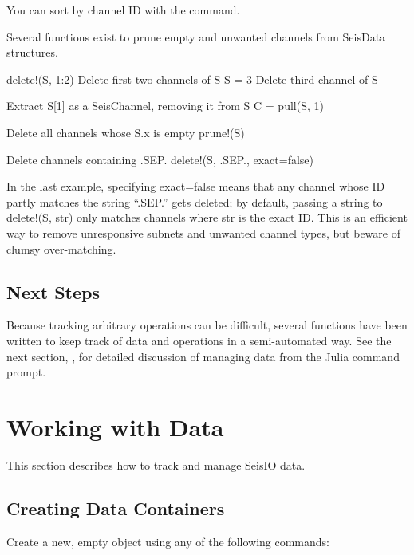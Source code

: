 \documentclass[letterpaper,11pt,english]{sphinxmanual}
\begin{document}
You can sort by channel ID with the  command.

Several functions exist to prune empty and unwanted channels from SeisData
structures.

%
\begin{sphinxVerbatim}[commandchars=\\\{\}]
delete!(S, 1:2)  \PYGZsh{} Delete first two channels of S
S \PYGZhy{}= 3           \PYGZsh{} Delete third channel of S

\PYGZsh{} Extract S[1] as a SeisChannel, removing it from S
C = pull(S, 1)

\PYGZsh{} Delete all channels whose S.x is empty
prune!(S)

\PYGZsh{} Delete channels containing \PYGZdq{}.SEP.\PYGZdq{}
delete!(S, \PYGZdq{}.SEP.\PYGZdq{}, exact=false)
\end{sphinxVerbatim}

In the last example, specifying exact=false means that any channel whose ID
partly matches the string “.SEP.” gets deleted; by default, passing
a string to delete!(S, str) only matches channels where str is the exact ID.
This is an efficient way to remove unresponsive subnets and unwanted channel
types, but beware of clumsy over-matching.


\subsection{Next Steps}
\label{\detokenize{src/tutorial:next-steps}}
Because tracking arbitrary operations can be difficult, several functions have
been written to keep track of data and operations in a semi-automated way. See
the next section, {\hyperref[\detokenize{src/working_with_data:wwd}]{}}, for detailed discussion of
managing data from the Julia command prompt.


\section{Working with Data}
\label{\detokenize{src/working_with_data:working-with-data}}\label{\detokenize{src/working_with_data:wwd}}\label{\detokenize{src/working_with_data::doc}}
This section describes how to track and manage SeisIO data.


\subsection{Creating Data Containers}
\label{\detokenize{src/working_with_data:creating-data-containers}}
Create a new, empty object using any of the following commands:
\end{document}
